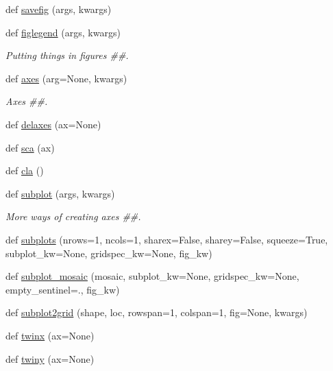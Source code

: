 \begin{DoxyCompactItemize}
def \hyperlink{namespacematplotlib_1_1pyplot_aab3d07a21b2fcea932693b94188e4144}{savefig} (args, kwargs)
\item 
def \hyperlink{namespacematplotlib_1_1pyplot_a75715168eb3062f02d2fe7fa81919af7}{figlegend} (args, kwargs)
\begin{DoxyCompactList}\small\item\em Putting things in figures \#\#. \end{DoxyCompactList}\item 
def \hyperlink{namespacematplotlib_1_1pyplot_aa0eca2d14aeb5c7f39cac7d252e4d09f}{axes} (arg=None, kwargs)
\begin{DoxyCompactList}\small\item\em Axes \#\#. \end{DoxyCompactList}\item 
def \hyperlink{namespacematplotlib_1_1pyplot_ae2619961af9edc4db42a37429e4f2897}{delaxes} (ax=None)
\item 
def \hyperlink{namespacematplotlib_1_1pyplot_abecf10b61b1d74f1f42b64043c7a6624}{sca} (ax)
\item 
def \hyperlink{namespacematplotlib_1_1pyplot_ae6abe8750f49b2c2c8f22395cc9c35fc}{cla} ()
\item 
def \hyperlink{namespacematplotlib_1_1pyplot_a8278cc1551039e364e92fde41a2a3ba2}{subplot} (args, kwargs)
\begin{DoxyCompactList}\small\item\em More ways of creating axes \#\#. \end{DoxyCompactList}\item 
def \hyperlink{namespacematplotlib_1_1pyplot_a777939c1af7108efa460136a1eabc962}{subplots} (nrows=1, ncols=1, sharex=False, sharey=False, squeeze=True, subplot\+\_\+kw=None, gridspec\+\_\+kw=None, fig\+\_\+kw)
\item 
def \hyperlink{namespacematplotlib_1_1pyplot_a17edd7c78e70ab40aac3e6aa0fba77e6}{subplot\+\_\+mosaic} (mosaic, subplot\+\_\+kw=None, gridspec\+\_\+kw=None, empty\+\_\+sentinel=\textquotesingle{}.\textquotesingle{}, fig\+\_\+kw)
\item 
def \hyperlink{namespacematplotlib_1_1pyplot_ad54c5a7bb02f4bee37a873720b14884a}{subplot2grid} (shape, loc, rowspan=1, colspan=1, fig=None, kwargs)
\item 
def \hyperlink{namespacematplotlib_1_1pyplot_a1f7275c0a074da1bf2312d6c739db877}{twinx} (ax=None)
\item 
def \hyperlink{namespacematplotlib_1_1pyplot_aa5dcf3ca26ba51ee0d49138a7fcd33cf}{twiny} (ax=None)

\end{DoxyCompactItemize}
